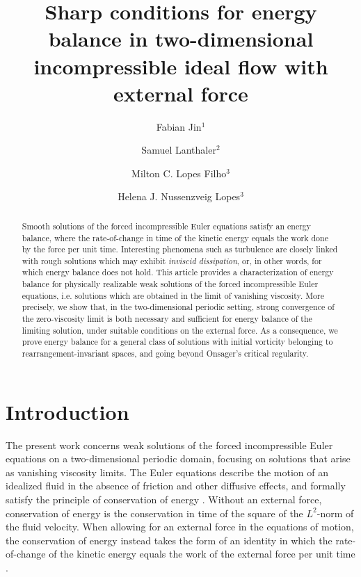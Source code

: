 \documentclass[reqno,12pt]{amsart}
\title[Energy balance]{Sharp conditions for energy balance in two-dimensional incompressible ideal flow with external force}
\author[Jin]{Fabian Jin$^1$}
\author[Lanthaler]{Samuel Lanthaler$^2$}
\author[Lopes Filho]{Milton C. Lopes Filho$^3$}
\author[Nussenzveig Lopes]{Helena J. Nussenzveig Lopes$^3$}
\begin{document}
\begin{abstract}
Smooth solutions of the forced incompressible Euler equations satisfy an energy balance, where the rate-of-change in time of the kinetic energy equals the work done by the force per unit time. Interesting phenomena such as turbulence are closely linked with rough solutions which may exhibit {\it inviscid dissipation}, or, in other words, for which energy balance does not hold.
This article provides a characterization of energy balance for physically realizable weak solutions of the forced incompressible Euler equations, i.e. solutions which are obtained in the limit of vanishing viscosity. More precisely, we show that, in the two-dimensional periodic setting, strong convergence of the zero-viscosity limit is both necessary and sufficient for energy balance of the limiting solution, under suitable conditions on the external force. As a consequence, we prove energy balance for a general class of solutions with initial  vorticity belonging to rearrangement-invariant spaces, and going beyond Onsager's critical regularity.
\end{abstract}

\maketitle


\section{Introduction}

The present work concerns weak solutions of the forced incompressible Euler equations on a two-dimensional periodic domain, focusing on solutions that arise as vanishing viscosity limits.
The Euler equations describe the motion of an idealized fluid in the absence of friction and other diffusive effects, and formally satisfy the principle of conservation of energy \cite{MajdaBertozzi}. Without an external force, conservation of energy is the conservation in time of the square of the $L^2$-norm of the fluid velocity. When allowing for an external force in the equations of motion, the conservation of energy instead takes the form of an identity in which the rate-of-change of the kinetic energy equals the work of the external force per unit time \cite{LN2022}.
\end{document}
